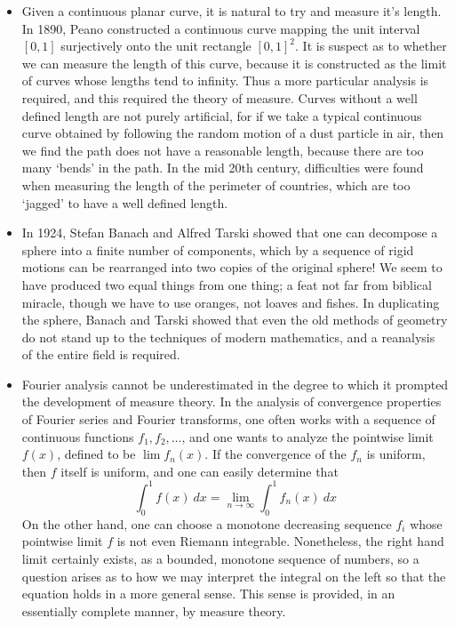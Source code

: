\begin{itemize}
  \item Given a continuous planar curve, it is natural to try and measure it's length. In 1890, Peano constructed a continuous curve mapping the unit interval $[0,1]$ surjectively onto the unit rectangle $[0,1]^2$. It is suspect as to whether we can measure the length of this curve, because it is constructed as the limit of curves whose lengths tend to infinity. Thus a more particular analysis is required, and this required the theory of measure. Curves without a well defined length are not purely artificial, for if we take a typical continuous curve obtained by following the random motion of a dust particle in air, then we find the path does not have a reasonable length, because there are too many `bends' in the path. In the mid 20th century, difficulties were found when measuring the length of the perimeter of countries, which are too `jagged' to have a well defined length.

  \item In 1924, Stefan Banach and Alfred Tarski showed that one can decompose a sphere into a finite number of components, which by a sequence of rigid motions can be rearranged into two copies of the original sphere! We seem to have produced two equal things from one thing; a feat not far from biblical miracle, though we have to use oranges, not loaves and fishes. In duplicating the sphere, Banach and Tarski showed that even the old methods of geometry do not stand up to the techniques of modern mathematics, and a reanalysis of the entire field is required.

  \item Fourier analysis cannot be underestimated in the degree to which it prompted the development of measure theory. In the analysis of convergence properties of Fourier series and Fourier transforms, one often works with a sequence of continuous functions $f_1, f_2, \dots$, and one wants to analyze the pointwise limit $f(x)$, defined to be $\lim f_n(x)$. If the convergence of the $f_n$ is uniform, then $f$ itself is uniform, and one can easily determine that
  \[ \int_0^1 f(x)\ dx = \lim_{n \to \infty} \int_0^1 f_n(x)\ dx \]
  On the other hand, one can choose a monotone decreasing sequence $f_i$ whose pointwise limit $f$ is not even Riemann integrable. Nonetheless, the right hand limit certainly exists, as a bounded, monotone sequence of numbers, so a question arises as to how we may interpret the integral on the left so that the equation holds in a more general sense. This sense is provided, in an essentially complete manner, by measure theory.
\end{itemize}
